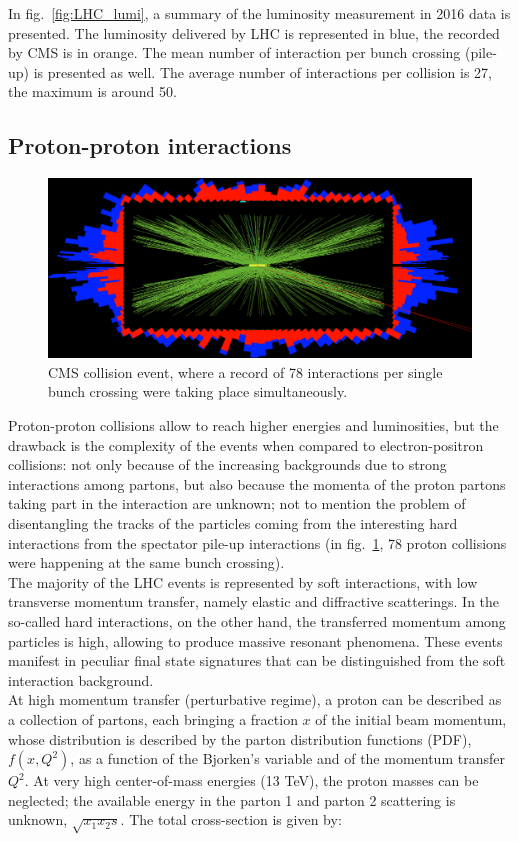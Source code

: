 \noindent In fig.~\ref{fig:LHC_lumi}, a summary of the luminosity measurement in 2016 data is presented. The luminosity delivered by LHC is represented in blue, the recorded by CMS is in orange. The mean number of interaction per bunch crossing (pile-up) is presented as well. The average number of interactions per collision is 27, the maximum is around 50.

\subsection{Proton-proton interactions}
\begin{figure}[!htb]
  \centering
    \includegraphics[width=.5\textwidth]{figures/78events_PU_b.png}
  \caption{CMS collision event, where a record of 78 interactions per single bunch crossing were taking place simultaneously.}
  \label{fig:pp_pileup}
\end{figure}
Proton-proton collisions allow to reach higher energies and luminosities, but the drawback is the complexity of the events when compared to electron-positron collisions: not only because of the increasing backgrounds due to strong interactions among partons, but also because the momenta of the proton partons taking part in the interaction are unknown; not to mention the problem of disentangling the tracks of the particles coming from the interesting hard interactions from the spectator pile-up interactions (in fig.~\ref{fig:pp_pileup}, 78 proton collisions were happening at the same bunch crossing).\\
The majority of the LHC events is represented by soft interactions, with low transverse momentum transfer, namely elastic and diffractive scatterings. In the so-called hard interactions, on the other hand, the transferred momentum among particles is high, allowing to produce massive resonant phenomena. These events manifest in peculiar final state signatures that can be distinguished from the soft interaction background.\\
At high momentum transfer (perturbative regime), a proton can be described as a collection of partons, each bringing a fraction $x$ of the initial beam momentum, whose distribution is described by the parton distribution functions (PDF), $f(x,Q^2)$, as a function of the Bjorken's variable and of the momentum transfer $Q^2$. At very high center-of-mass energies (13 TeV), the proton masses can be neglected; the available energy in the parton 1 and parton 2 scattering is unknown, $\sqrt{x_1 x_2 s}$. The total cross-section is given by:
